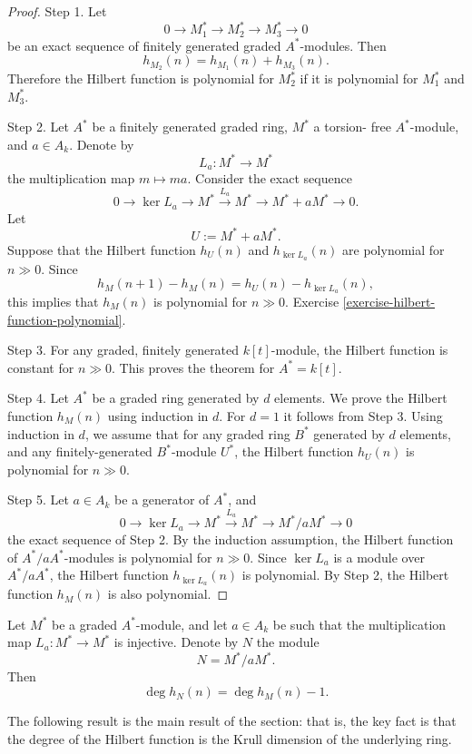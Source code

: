 \begin{proof}
Step 1. Let
$$
0\to M_1^\ast\to M_2^\ast\to M_3^\ast\to 0
$$
be an exact sequence of finitely generated
graded $A^\ast$-modules.
Then
$$
h_{M_2}(n)=h_{M_1}(n)+h_{M_3}(n).
$$
Therefore the Hilbert function is polynomial
for $M_2^\ast$ if it is polynomial for
$M_1^\ast$ and $M_3^\ast$.

Step 2. Let $A^\ast$ be a finitely
generated graded ring, $M^\ast$ a torsion-
free $A^\ast$-module, and $a\in A_k$.
Denote by
$$
L_a:M^\ast\to M^\ast
$$
the multiplication map $m\mapsto ma$.
Consider the exact sequence
$$
0\to \ker L_a\to M^\ast
\xrightarrow{L_a} M^\ast
\to M^\ast+aM^\ast\to 0.
$$
Let
$$
U:=M^\ast+aM^\ast.
$$
Suppose that the Hilbert function $h_U(n)$
and $h_{\ker L_a}(n)$ are polynomial for
$n\gg 0$.
Since
$$
h_M(n+1)-h_M(n)=h_U(n)-h_{\ker L_a}(n),
$$
this implies that $h_M(n)$ is polynomial for
$n\gg 0$.
Exercise
\ref{exercise-hilbert-function-polynomial}.

Step 3. For any graded, finitely generated
$k[t]$-module, the Hilbert function is
constant for $n\gg 0$.
This proves the theorem for $A^\ast=k[t]$.

Step 4. Let $A^\ast$ be a graded ring
generated by $d$ elements. We prove the
Hilbert function $h_M(n)$ using induction in
$d$. For $d=1$ it follows from Step 3.
Using induction in $d$, we assume that for
any graded ring $B^\ast$ generated by
$d$ elements, and any finitely-generated
$B^\ast$-module $U^\ast$, the Hilbert
function $h_U(n)$ is polynomial for
$n\gg 0$.

Step 5. Let $a\in A_k$ be a generator of
$A^\ast$, and
$$
0\to \ker L_a\to M^\ast
\xrightarrow{L_a} M^\ast
\to M^\ast/aM^\ast\to 0
$$
the exact sequence of Step 2.
By the induction assumption, the Hilbert
function of $A^\ast/aA^\ast$-modules is
polynomial for $n\gg 0$. Since $\ker L_a$
is a module over $A^\ast/aA^\ast$, the
Hilbert function $h_{\ker L_a}(n)$ is
polynomial. By Step 2, the Hilbert function
$h_M(n)$ is also polynomial.
\end{proof}

\begin{corollary}
\label{lemma-hilbert-degree-drop}
Let $M^\ast$ be a graded $A^\ast$-module,
and let $a\in A_k$ be such that the
multiplication map
$L_a:M^\ast\to M^\ast$ is injective.
Denote by $N$ the module
$$
N=M^\ast/aM^\ast.
$$
Then
$$
\deg h_N(n)=\deg h_M(n)-1.
$$
\end{corollary}

\medskip\noindent
The following result is the main result of
the section: that is, the key fact
is that the degree of the Hilbert
function is the Krull dimension of the
underlying ring.

